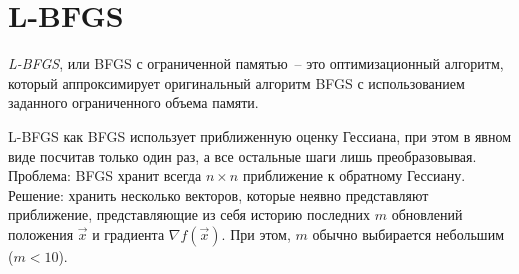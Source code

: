 \documentclass[12pt, a4paper, oneside, final]{article}
\begin{document}
	\section*{L-BFGS}
	\textit{L-BFGS}, или BFGS с ограниченной памятью~-- это оптимизационный алгоритм, который аппроксимирует оригинальный алгоритм BFGS с использованием заданного ограниченного объема памяти.

	L-BFGS как BFGS использует приближенную оценку Гессиана, при этом в явном виде посчитав только один раз, а все остальные шаги лишь преобразовывая.
	Проблема: BFGS хранит всегда $n \times n$ приближение к обратному Гессиану.
	Решение: хранить несколько векторов, которые неявно представляют приближение, представляющие из себя историю последних $m$ обновлений положения $\vec{x}$ и градиента $\nabla{f(\vec{x})}$.
	При этом, $m$ обычно выбирается небольшим ($m < 10$).
\end{document}
